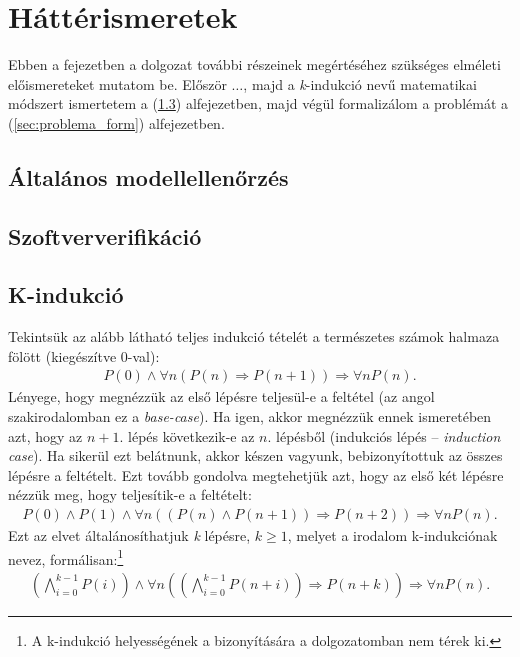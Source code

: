 \chapter{Háttérismeretek}

Ebben a fejezetben a dolgozat további részeinek megértéséhez szükséges elméleti előismereteket mutatom be. Először $ \ldots $, majd a \emph{k}-indukció nevű matematikai módszert \cite{k_induction_principle} ismertetem a (\ref{sec:k_induction}) alfejezetben, majd végül formalizálom a problémát a (\ref{sec:problema_form}) alfejezetben.

\section{Általános modellellenőrzés}
\label{sec:alt_mod}

\section{Szoftververifikáció}
\label{sec:szoftverver}

\section{K-indukció}
\label{sec:k_induction}

Tekintsük az alább látható teljes indukció tételét a természetes számok halmaza fölött (kiegészítve 0-val): 
\begin{align}
	P(0) \wedge \forall n (P(n) \Rightarrow P(n+1)) \Rightarrow \forall nP(n).
\end{align}
Lényege, hogy megnézzük az első lépésre teljesül-e a feltétel (az angol szakirodalomban ez a \emph{base-case}). Ha igen, akkor megnézzük ennek ismeretében azt, hogy az $n+1$. lépés következik-e az $n$. lépésből (indukciós lépés -- \emph{induction case}). Ha sikerül ezt belátnunk, akkor készen vagyunk, bebizonyítottuk az összes lépésre a feltételt.
\newline
\newline
Ezt tovább gondolva megtehetjük azt, hogy az első két lépésre nézzük meg, hogy teljesítik-e a feltételt:
\begin{align}
	P(0) \wedge P(1) \wedge \forall n ((P(n) \wedge P(n+1)) \Rightarrow P(n+2) ) \Rightarrow \forall n P(n).
\end{align}
Ezt az elvet általánosíthatjuk \emph{k} lépésre, $k \geq 1$, melyet a irodalom \cite{k_induction_principle} k-indukciónak nevez, formálisan:\footnote{A k-indukció helyességének a bizonyítására a dolgozatomban nem térek ki.}
\begin{align}
	\left( \bigwedge_{i=0}^{k-1} P(i) \right) \wedge \forall n \left( \left( \bigwedge_{i=0}^{k-1} P(n+i) \right) \Rightarrow P(n+k) \right) \Rightarrow \forall n P(n).
\end{align}

